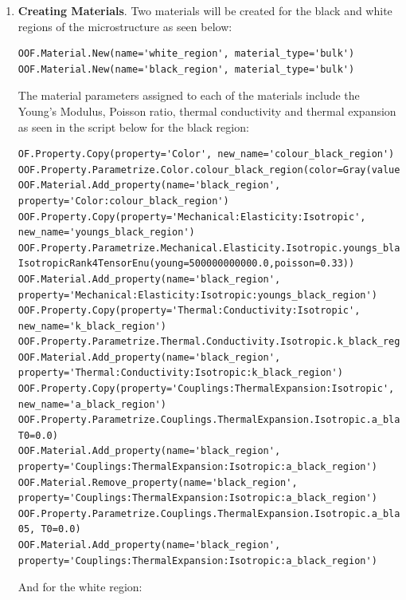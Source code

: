 \documentclass{article}
\begin{document}
\begin{enumerate}
\item \textbf{Creating Materials}. Two materials will be created for the black and white regions of the microstructure as seen below:

\lstset{language=Python}
\begin{lstlisting}
OOF.Material.New(name='white_region', material_type='bulk')
OOF.Material.New(name='black_region', material_type='bulk')
\end{lstlisting}

The material parameters assigned to each of the materials include the Young's Modulus, Poisson ratio, thermal conductivity and thermal expansion as seen in the script below for the black region:

\lstset{language=Python}
\begin{lstlisting}
OF.Property.Copy(property='Color', new_name='colour_black_region')
OOF.Property.Parametrize.Color.colour_black_region(color=Gray(value=0.0))
OOF.Material.Add_property(name='black_region', property='Color:colour_black_region')
OOF.Property.Copy(property='Mechanical:Elasticity:Isotropic', new_name='youngs_black_region')
OOF.Property.Parametrize.Mechanical.Elasticity.Isotropic.youngs_black_region(cijkl=
IsotropicRank4TensorEnu(young=500000000000.0,poisson=0.33))
OOF.Material.Add_property(name='black_region', property='Mechanical:Elasticity:Isotropic:youngs_black_region')
OOF.Property.Copy(property='Thermal:Conductivity:Isotropic', new_name='k_black_region')
OOF.Property.Parametrize.Thermal.Conductivity.Isotropic.k_black_region(kappa=500)
OOF.Material.Add_property(name='black_region', property='Thermal:Conductivity:Isotropic:k_black_region')
OOF.Property.Copy(property='Couplings:ThermalExpansion:Isotropic', new_name='a_black_region')
OOF.Property.Parametrize.Couplings.ThermalExpansion.Isotropic.a_black_region(alpha=1000, T0=0.0)
OOF.Material.Add_property(name='black_region', property='Couplings:ThermalExpansion:Isotropic:a_black_region')
OOF.Material.Remove_property(name='black_region', property='Couplings:ThermalExpansion:Isotropic:a_black_region')
OOF.Property.Parametrize.Couplings.ThermalExpansion.Isotropic.a_black_region(alpha=5e-05, T0=0.0)
OOF.Material.Add_property(name='black_region', property='Couplings:ThermalExpansion:Isotropic:a_black_region')
\end{lstlisting}

And for the white region:


\end{enumerate}
\end{document}
